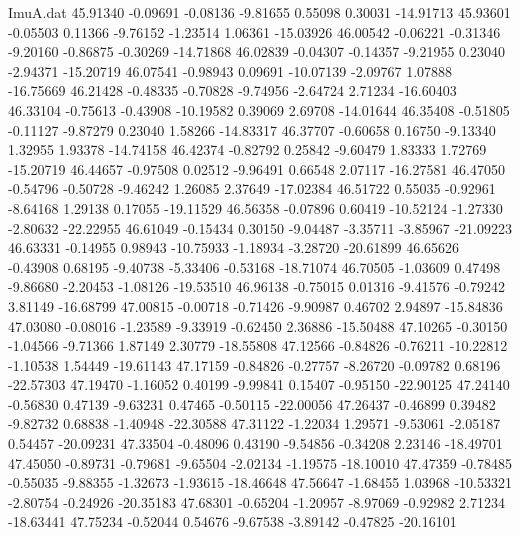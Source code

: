 \begin{filecontents}{ImuA.dat}
  45.91340   -0.09691   -0.08136   -9.81655    0.55098    0.30031  -14.91713
  45.93601   -0.05503    0.11366   -9.76152   -1.23514    1.06361  -15.03926
  46.00542   -0.06221   -0.31346   -9.20160   -0.86875   -0.30269  -14.71868
  46.02839   -0.04307   -0.14357   -9.21955    0.23040   -2.94371  -15.20719
  46.07541   -0.98943    0.09691  -10.07139   -2.09767    1.07888  -16.75669
  46.21428   -0.48335   -0.70828   -9.74956   -2.64724    2.71234  -16.60403
  46.33104   -0.75613   -0.43908  -10.19582    0.39069    2.69708  -14.01644
  46.35408   -0.51805   -0.11127   -9.87279    0.23040    1.58266  -14.83317
  46.37707   -0.60658    0.16750   -9.13340    1.32955    1.93378  -14.74158
  46.42374   -0.82792    0.25842   -9.60479    1.83333    1.72769  -15.20719
  46.44657   -0.97508    0.02512   -9.96491    0.66548    2.07117  -16.27581
  46.47050   -0.54796   -0.50728   -9.46242    1.26085    2.37649  -17.02384
  46.51722    0.55035   -0.92961   -8.64168    1.29138    0.17055  -19.11529
  46.56358   -0.07896    0.60419  -10.52124   -1.27330   -2.80632  -22.22955
  46.61049   -0.15434    0.30150   -9.04487   -3.35711   -3.85967  -21.09223
  46.63331   -0.14955    0.98943  -10.75933   -1.18934   -3.28720  -20.61899
  46.65626   -0.43908    0.68195   -9.40738   -5.33406   -0.53168  -18.71074
  46.70505   -1.03609    0.47498   -9.86680   -2.20453   -1.08126  -19.53510
  46.96138   -0.75015    0.01316   -9.41576   -0.79242    3.81149  -16.68799
  47.00815   -0.00718   -0.71426   -9.90987    0.46702    2.94897  -15.84836
  47.03080   -0.08016   -1.23589   -9.33919   -0.62450    2.36886  -15.50488
  47.10265   -0.30150   -1.04566   -9.71366    1.87149    2.30779  -18.55808
  47.12566   -0.84826   -0.76211  -10.22812   -1.10538    1.54449  -19.61143
  47.17159   -0.84826   -0.27757   -8.26720   -0.09782    0.68196  -22.57303
  47.19470   -1.16052    0.40199   -9.99841    0.15407   -0.95150  -22.90125
  47.24140   -0.56830    0.47139   -9.63231    0.47465   -0.50115  -22.00056
  47.26437   -0.46899    0.39482   -9.82732    0.68838   -1.40948  -22.30588
  47.31122   -1.22034    1.29571   -9.53061   -2.05187    0.54457  -20.09231
  47.33504   -0.48096    0.43190   -9.54856   -0.34208    2.23146  -18.49701
  47.45050   -0.89731   -0.79681   -9.65504   -2.02134   -1.19575  -18.10010
  47.47359   -0.78485   -0.55035   -9.88355   -1.32673   -1.93615  -18.46648
  47.56647   -1.68455    1.03968  -10.53321   -2.80754   -0.24926  -20.35183
  47.68301   -0.65204   -1.20957   -8.97069   -0.92982    2.71234  -18.63441
  47.75234   -0.52044    0.54676   -9.67538   -3.89142   -0.47825  -20.16101

\end{filecontents}
